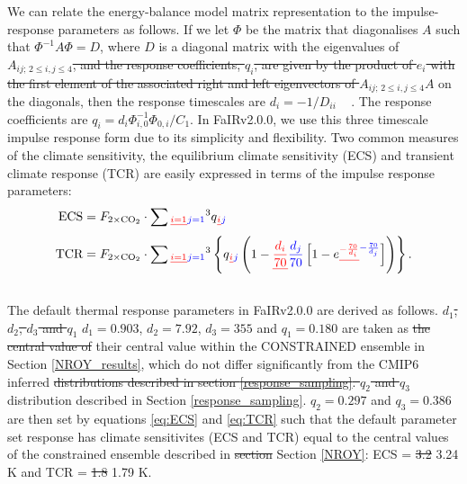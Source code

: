 \documentclass[gmd, manuscript]{copernicus}
\providecommand{\DIFadd}[1]{{\protect\color{blue}#1}} %
\providecommand{\DIFdel}[1]{{\protect\color{red}\sout{#1}}}                      %
\providecommand{\DIFaddbegin}{} %
\providecommand{\DIFaddend}{} %
\providecommand{\DIFdelbegin}{} %
\providecommand{\DIFdelend}{} %
\begin{document}
\DIFadd{We can relate the energy-balance model matrix representation to the impulse-response parameters as follows. If we let $\Phi$ be the matrix that diagonalises $A$ such that $\Phi^{-1}A\Phi=D$, where $D$ is a diagonal matrix with }\DIFaddend the eigenvalues of \DIFdelbegin \DIFdel{$A_{ij;\,2\leq i,j \leq 4}$, and the response coefficients, $q_i$, are given by the product of $e_i$ with the first element of the associated right and left eigenvectors of $A_{ij;\,2\leq i,j \leq 4}$}\DIFdelend \DIFaddbegin \DIFadd{$A$ on the diagonals, then the response timescales are $d_i=-1/D_{ii}$ \mbox{%
\citep{Geoffroy2013}}\hspace{0pt}%
. The response coefficients are $q_i=d_i \Phi^{-1}_{i,0} \Phi_{0,i} / C_1$}\DIFaddend . In FaIRv2.0\DIFaddbegin \DIFadd{.0}\DIFaddend , we use this three timescale impulse response form due to its simplicity and flexibility. Two common measures of the climate sensitivity, the equilibrium climate sensitivity (ECS) and transient climate response (TCR) \citep{Collins2013} are easily expressed in terms of the impulse response parameters:\DIFaddbegin \\
\DIFaddend \begin{align}
    \text{ECS}&=F_{2\times \text{CO}_2} \cdot \sum\DIFdelbegin \DIFdel{_{i=1}}\DIFdelend \DIFaddbegin \DIFadd{_{j=1}}\DIFaddend ^3 q\DIFdelbegin \DIFdel{_i }\DIFdelend \DIFaddbegin \DIFadd{_j }\DIFaddend \label{eq:ECS}\\
    \text{TCR}&=F_{2\times \text{CO}_2} \cdot \sum\DIFdelbegin \DIFdel{_{i=1}}\DIFdelend \DIFaddbegin \DIFadd{_{j=1}}\DIFaddend ^3 \left\{q\DIFdelbegin \DIFdel{_i}\DIFdelend \DIFaddbegin \DIFadd{_j}\DIFaddend \left(1-\DIFdelbegin \DIFdel{\frac{d_i}{70}}\DIFdelend \DIFaddbegin \DIFadd{\frac{d_j}{70}}\DIFaddend \left[1-e\DIFdelbegin \DIFdel{^{-\frac{70}{d_i}}}\DIFdelend \DIFaddbegin \DIFadd{^{-\frac{70}{d_j}}}\DIFaddend \right]\right)\right\}. \label{eq:TCR}
\end{align}\DIFaddbegin \\
\DIFaddend The default thermal response parameters in FaIRv2.0\DIFaddbegin \DIFadd{.0 }\DIFaddend are derived as follows. \DIFdelbegin \DIFdel{$d_1$, $d_2$, $d_3$ and $q_1$ }\DIFdelend \DIFaddbegin \DIFadd{$d_1=0.903$, $d_2=7.92$, $d_3=355$ and $q_1=0.180$ }\DIFaddend are taken as \DIFdelbegin \DIFdel{the central value of }\DIFdelend \DIFaddbegin \DIFadd{their central value within the CONSTRAINED ensemble in Section \ref{NROY_results}, which do not differ significantly from }\DIFaddend the CMIP6 inferred \DIFdelbegin \DIFdel{distributions described in section \ref{response_sampling}. $q_2$ and $q_3$ }\DIFdelend \DIFaddbegin \DIFadd{distribution described in Section \ref{response_sampling}. $q_2=0.297$ and $q_3=0.386$ }\DIFaddend are then set by equations \ref{eq:ECS} and \ref{eq:TCR} such that the default parameter set response has climate sensitivites (ECS and TCR) equal to the central values of the constrained ensemble described in \DIFdelbegin \DIFdel{section }\DIFdelend \DIFaddbegin \DIFadd{Section }\DIFaddend \ref{NROY}: ECS = \DIFdelbegin \DIFdel{3.2 }\DIFdelend \DIFaddbegin \DIFadd{3.24 }\DIFaddend K and TCR = \DIFdelbegin \DIFdel{1.8 }\DIFdelend \DIFaddbegin \DIFadd{1.79 }\DIFaddend K.
\end{document}

